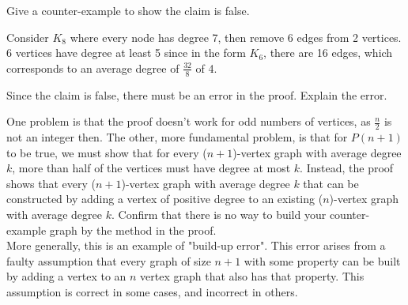 \question Give a counter-example to show the claim is false.
\begin{solution}[1 in]
Consider $K_8$ where every node has degree 7, then remove 6 edges from 2 vertices. 6 vertices have degree at least 5 since in the form $K_6$, there are 16 edges, which corresponds to an average degree of $\frac{32}{8}$ of 4. 
\end{solution}


\question Since the claim is false, there must be an error in the proof. Explain the error. 
\begin{solution}[1.5 in]
One problem is that the proof doesn't work for odd numbers of vertices, as $\frac{n}{2}$ is not an integer then. 
The other, more fundamental problem, is that for $P(n+1)$ to be true, we must show that for every ($n+1$)-vertex graph with average degree $k$, more than half of the vertices must have degree at most $k$. Instead, the proof shows that every ($n+1$)-vertex graph with average degree $k$ that can be constructed by adding a vertex of positive degree to an existing ($n$)-vertex graph with average degree $k$. Confirm that there is no way to build your counter-example graph by the method in the proof. \\
More generally, this is an example of "build-up error". This error arises from a faulty assumption that every graph of size $n+1$ with some property can be built by adding a vertex to an $n$ vertex graph that also has that property. This assumption is correct in some cases, and incorrect in others. 
\end{solution}